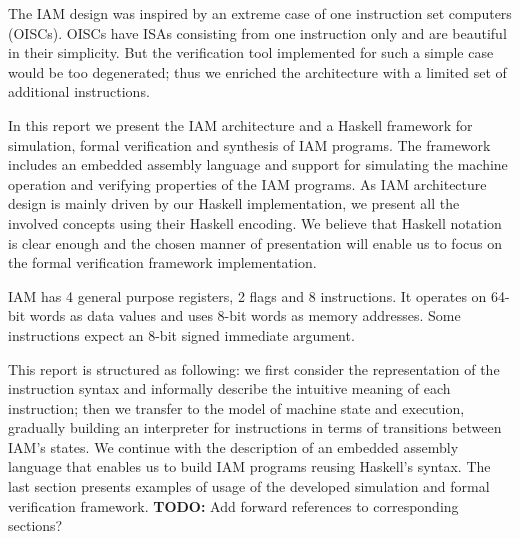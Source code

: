 The IAM design was inspired by an extreme case of one instruction
set computers (OISCs). OISCs have ISAs consisting from one instruction only and are
beautiful in their simplicity. But the verification tool implemented for such a
simple case would be too degenerated; thus we enriched the architecture with a
limited set of additional instructions.

In this report we present the IAM architecture and a Haskell framework for
simulation, formal verification and synthesis of IAM programs.
The framework includes an embedded assembly language and support for
simulating the machine operation and verifying properties of the IAM programs. As
IAM architecture design is mainly driven by our Haskell implementation, we
present all the involved concepts using their Haskell encoding. We believe that
Haskell notation is clear enough and the chosen manner of presentation will
enable us to focus on the formal verification framework implementation.

IAM has 4 general purpose registers, 2 flags and 8 instructions. It
operates on 64-bit words as data values and uses 8-bit words as memory addresses.
Some instructions expect an 8-bit signed immediate argument.

This report is structured as following: we first consider the representation of
the instruction syntax and informally describe the intuitive meaning of each
instruction; then we transfer to the model of machine state and execution,
gradually building an interpreter for instructions in terms of transitions
between IAM's states. We continue with the description of an embedded assembly
language that enables us to build IAM programs reusing Haskell's syntax.
The last section presents examples of usage of the developed simulation
and formal verification framework. \textbf{TODO:} Add forward references to
corresponding sections?

\clearpage